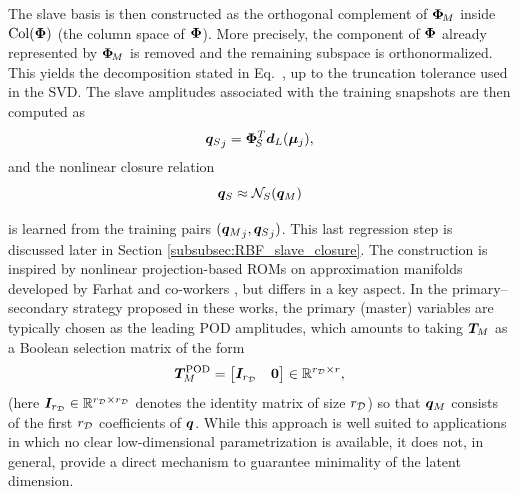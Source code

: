 \documentclass[11pt,a4paper]{article}
\begin{document}
The slave basis is then constructed as the orthogonal complement of $\bm{\Phi}_{\!M}$
inside $\operatorname{Col}(\bm{\Phi})$  (the column space of $\bm{\Phi}$). More precisely, the component of $\bm{\Phi}$ already
represented by $\bm{\Phi}_{\!M}$ is removed and the remaining subspace is
orthonormalized. This yields the decomposition stated in
Eq.~, up to the truncation tolerance
used in the SVD. The slave amplitudes associated with the training snapshots
are then computed as
\[
    {\bm{q}_{S}}_j=\bm{\Phi}_{\!S}^T\bm{d}_L(\bm{\mu}_j),
\]
and the nonlinear closure relation
\begin{equation}
\label{eq:closure}
     \bm{q}_{S}\approx\mathcal{N}_{S}(\bm{q}_M)
\end{equation}


is learned from the training pairs $({\bm{q}_M}_j,{\bm{q}_{S}}_j)$. This last regression
step is discussed later in Section \ref{subsubsec:RBF_slave_closure}.
The construction is inspired by nonlinear projection-based ROMs on
approximation manifolds developed by Farhat and co-workers
\cite{barnett2022quadratic,barnett2023neural,ares2026nonlinear}, but differs
in a key aspect. In the primary--secondary strategy proposed in these works,
the primary (master) variables are typically chosen as the leading POD amplitudes, which
amounts to taking $\bm{T}_{M}$ as a Boolean selection matrix of the form
\[
    \bm{T}_{M}^{\mathrm{POD}}
    =
    \begin{bmatrix}
    \bm{I}_{r_{\mathcal{D}}} & \bm{0}
    \end{bmatrix}
    \in\mathbb{R}^{r_{\mathcal{D}}\times r},
\]
(here    $\bm{I}_{r_{\mathcal{D}}}\in\mathbb{R}^{r_{\mathcal{D}}\times r_{\mathcal{D}}}$ denotes the identity matrix of size $r_{\mathcal{D}}$)  so that $\bm{q}_M$ consists of the first $r_{\mathcal{D}}$ coefficients of $\bm{q}$. While this
approach is well suited to applications in which no clear low-dimensional
parametrization is available, it does not, in general, provide a direct
mechanism to guarantee minimality of the latent dimension.

\end{document}
